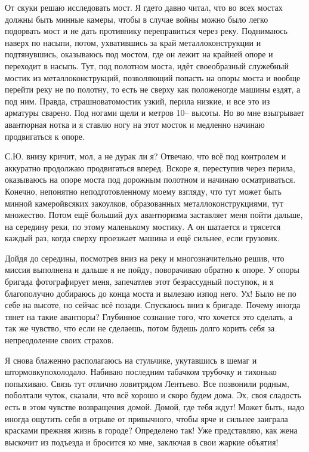 От скуки решаю исследовать мост. Я где\sdash то давно читал, что во всех мостах должны быть минные камеры, чтобы в случае войны можно было легко подорвать мост и не дать противнику переправиться через реку. Поднимаюсь наверх по насыпи, потом, ухватившись за край металлоконструкции и подтянувшись, оказываюсь под мостом, где он лежит на крайней опоре и переходит в насыпь. Тут, под полотном моста, идёт своеобразный служебный мостик из металлоконструкций, позволяющий попасть на опоры моста и вообще перейти реку не по полотну, то есть не сверху как положено\mdash где машины ездят, а под ним. Правда, страшновато\mdash мостик узкий, перила низкие, и все это из арматуры сварено. Под ногами щели и метров 10\thinspace\nobreakdash-- высоты. Но во мне взыгрывает авантюрная нотка и я ставлю ногу на этот мосток и медленно начинаю продвигаться к опоре. 

С.Ю. внизу кричит, мол, а не дурак ли я? Отвечаю, что всё под контролем и аккуратно продолжаю продвигаться вперед. Вскоре я, переступив через перила, оказываюсь на опоре моста под дорожным полотном и начинаю осматриваться. Конечно, непонятно неподготовленному моему взгляду, что тут может быть минной камерой\mdash всяких закоулков, образованных металлоконструкциями, тут множество. Потом ещё больший дух авантюризма заставляет меня пойти дальше, на середину реки, по этому маленькому мостику. А он шатается и трясется каждый раз, когда сверху проезжает машина и ещё сильнее, если грузовик. 

Дойдя до середины, посмотрев вниз на реку и многозначительно решив, что миссия выполнена и дальше я не пойду, поворачиваю обратно к опоре. У опоры бригада фотографирует меня, запечатлев этот безрассудный поступок, и я благополучно добираюсь до конца моста и вылезаю из\sdash под него. Ух! Было не по себе на высоте, но сейчас всё позади. Спускаюсь вниз к бригаде. Почему иногда тянет на такие авантюры? Глубинное сознание того, что хочется это сделать, а так же чувство, что если не сделаешь, потом будешь долго корить себя за непреодоление своих страхов.

Я снова блаженно располагаюсь на стульчике, укутавшись в шемаг и штормовку\mdash похолодало. Набиваю последним табачком трубочку и тихонько попыхиваю. Связь тут отлично ловит\mdash рядом Лентьево. Все позвонили родным, поболтали чуток, сказали, что всё хорошо и скоро будем дома. Эх, своя сладость есть в этом чувстве возвращения домой. Домой, где тебя ждут! Может быть, надо иногда ощутить себя в отрыве от привычного, чтобы ярче и сильнее заиграла красками прежняя жизнь в городе? Определено так! Уже представляю, как жена выскочит из подъезда и бросится ко мне, заключая в свои жаркие объятия!

